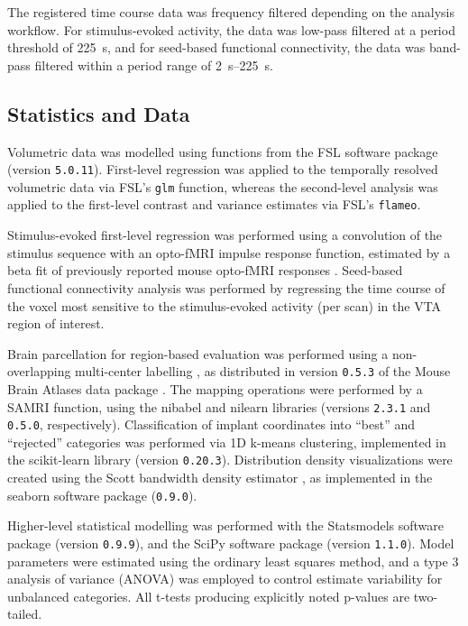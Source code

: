 The registered time course data was frequency filtered depending on the analysis workflow.
For stimulus-evoked activity, the data was low-pass filtered at a period threshold of \SI{225}{\second}, and for seed-based functional connectivity, the data was band-pass filtered within a period range of \SIrange{2}{225}{\second}.

\subsection{Statistics and Data}
Volumetric data was modelled using functions from the FSL software package \cite{fsl} (version \textcolor{mg}{\texttt{5.0.11}}).
First-level regression was applied to the temporally resolved volumetric data via FSL's \textcolor{mg}{\texttt{glm}} function, whereas the second-level analysis was applied to the first-level contrast and variance estimates via FSL's \textcolor{mg}{\texttt{flameo}}.

Stimulus-evoked first-level regression was performed using a convolution of the stimulus sequence with an opto-fMRI impulse response function, estimated by a beta fit of previously reported mouse opto-fMRI responses \cite{Grandjean2019}.
Seed-based functional connectivity analysis was performed by regressing the time course of the voxel most sensitive to the stimulus-evoked activity (per scan) in the VTA region of interest.

Brain parcellation for region-based evaluation was performed using a non-overlapping multi-center labelling \cite{dsu1,dsu2,dsu3,dsu4}, as distributed in version \textcolor{mg}{\texttt{0.5.3}} of the Mouse Brain Atlases data package \cite{atlases_generator}.
The mapping operations were performed by a SAMRI function, using the nibabel \cite{nibabel} and nilearn \cite{nilearn} libraries (versions \textcolor{mg}{\texttt{2.3.1}} and \textcolor{mg}{\texttt{0.5.0}}, respectively).
Classification of implant coordinates into “best” and “rejected” categories was performed via 1D k-means clustering, implemented in the scikit-learn library \cite{scikit-learn} (version \textcolor{mg}{\texttt{0.20.3}}).
Distribution density visualizations were created using the Scott bandwidth density estimator \cite{Scott1979}, as implemented in the seaborn software package (\textcolor{mg}{\texttt{0.9.0}}).

Higher-level statistical modelling was performed with the Statsmodels software package \cite{statsmodels} (version \textcolor{mg}{\texttt{0.9.9}}), and the SciPy software package \cite{scipy} (version \textcolor{mg}{\texttt{1.1.0}}).
Model parameters were estimated using the ordinary least squares method, and a type 3 analysis of variance (ANOVA) was employed to control estimate variability for unbalanced categories.
All t-tests producing explicitly noted p-values are two-tailed.

